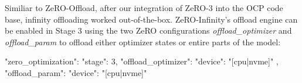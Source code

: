 Similiar to ZeRO-Offload, after our integration of ZeRO-3 into the OCP 
code base, infinity offloading worked out-of-the-box. ZeRO-Infinity's
offload engine can be enabled in Stage 3 using the two ZeRO configurations 
\textit{offload\_optimizer} and \textit{offload\_param} to offload 
either optimizer states or entire parts of the model:

\newpage
\begin{json}
"zero_optimization": {
    "stage": 3,
    "offload_optimizer": {
        "device": "[cpu|nvme]"
    },
    "offload_param": {
        "device": "[cpu|nvme]"
    }
}
\end{json}